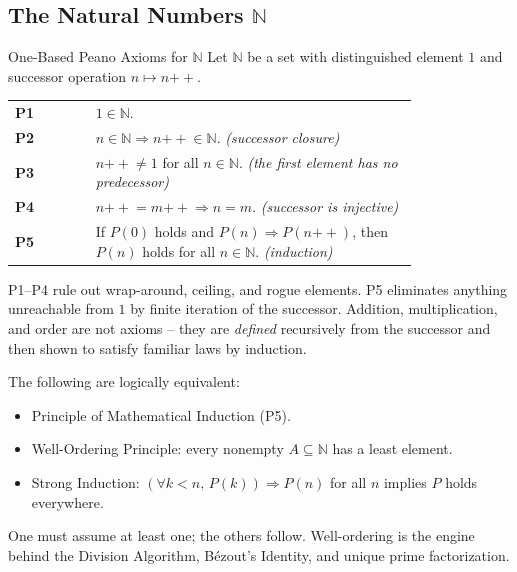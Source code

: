 

\subsection*{\texorpdfstring{The Natural Numbers $\mathbb{N}$}{The Natural Numbers N}}

\begin{axiombox}{One-Based Peano Axioms for $\mathbb{N}$}
Let $\mathbb{N}$ be a set with distinguished element $1$
and successor operation $n \mapsto n{+\!\!+}$.

\medskip
\begin{tabular}{@{} l p{0.80\linewidth} @{}}
\textbf{P1} & $1 \in \mathbb{N}$. \\[4pt]
\textbf{P2} & $n \in \mathbb{N} \Rightarrow n{+\!\!+} \in \mathbb{N}$.
             \hfill\textit{(successor closure)} \\[4pt]
\textbf{P3} & $n{+\!\!+} \neq 1$ for all $n \in \mathbb{N}$.
             \hfill\textit{(the first element has no predecessor)} \\[4pt]
\textbf{P4} & $n{+\!\!+} = m{+\!\!+} \Rightarrow n = m$.
             \hfill\textit{(successor is injective)} \\[4pt]
\textbf{P5} & If $P(0)$ holds and $P(n) \Rightarrow P(n{+\!\!+})$,
             then $P(n)$ holds for all $n \in \mathbb{N}$.
             \hfill\textit{(induction)} \\
\end{tabular}
\end{axiombox}

\begin{remark*}
P1--P4 rule out wrap-around, ceiling, and rogue elements.
P5 eliminates anything unreachable from $1$ by finite iteration of the
successor.
Addition, multiplication, and order are not axioms -- they are \emph{defined}
recursively from the successor and then shown to satisfy familiar laws by
induction.
\end{remark*}

\begin{remark*}
The following are logically equivalent:
\begin{itemize}
  \item Principle of Mathematical Induction (P5).
  \item Well-Ordering Principle: every nonempty $A \subseteq \mathbb{N}$
        has a least element.
  \item Strong Induction: $(\forall k < n,\, P(k)) \Rightarrow P(n)$
        for all $n$ implies $P$ holds everywhere.
\end{itemize}
One must assume at least one; the others follow.
Well-ordering is the engine behind the Division Algorithm, B\'{e}zout's Identity,
and unique prime factorization.
\end{remark*}

